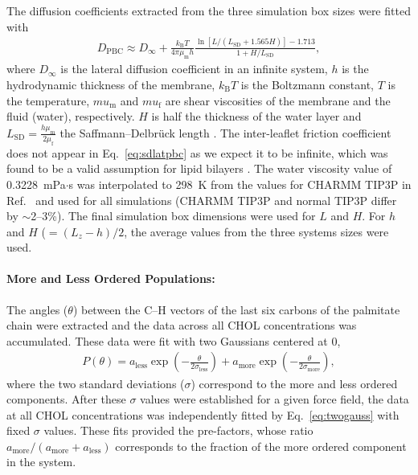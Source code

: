 \documentclass[aps,prl,superscriptaddress]{revtex4-2}
\begin{document}
The diffusion coefficients extracted from the three simulation box sizes were fitted with
%
\begin{align}
	D_\mathrm{PBC}\approx D_\infty+\frac{k_\mathrm{B}T}{4\pi\mu_\mathrm{m}h}\frac{\ln\left[L/\left(L_\mathrm{SD}+1.565H\right)\right]-1.713}{1+H/L_\mathrm{SD}},
	\label{eq:sdlatpbc}
\end{align}
%
where $D_\infty$ is the lateral diffusion coefficient in an infinite system, $h$ is the hydrodynamic thickness of the membrane, $k_\mathrm{B}T$ is the Boltzmann constant, $T$ is the temperature, $mu_\mathrm{m}$ and $mu_\mathrm{f}$ are shear viscosities of the membrane and the fluid (water), respectively. $H$ is half the thickness of the water layer and $L_\mathrm{SD}=\frac{h\mu_\mathrm{m}}{2\mu_\mathrm{f}}$ the Saffmann--Delbr\"{u}ck length \cite{vogele2018hydrodynamics}. The inter-leaflet friction coefficient does not appear in Eq.~\eqref{eq:sdlatpbc} as we expect it to be infinite, which was found to be a valid assumption for lipid bilayers \cite{vogele2018hydrodynamics}. The water viscosity value of 0.3228~mPa$\cdot$s was interpolated to 298~K from the values for CHARMM TIP3P in Ref.~ and used for all simulations (CHARMM TIP3P and normal TIP3P differ by $\sim$2--3\%). The final simulation box dimensions were used for $L$ and $H$. For $h$ and $H$ ($=(L_z-h)/2$, the average values from the three systems sizes were used. 

\paragraph{More and Less Ordered Populations:} The angles ($\theta$) between the C--H vectors of the last six carbons of the palmitate chain were extracted and the data across all CHOL concentrations was accumulated. These data were fit with two Gaussians centered at 0,
%
\begin{align}
    P(\theta)=a_\mathrm{less}\exp\left(-\frac{\theta}{2\sigma_\mathrm{less}}\right)+a_\mathrm{more}\exp\left(-\frac{\theta}{2\sigma_\mathrm{more}}\right),
    \label{eq:twogauss}
\end{align}
%
where the two standard deviations ($\sigma$) correspond to the more and less ordered components. After these $\sigma$ values were established for a given force field, the data at all CHOL concentrations was independently fitted by Eq.~\eqref{eq:twogauss} with fixed $\sigma$ values. These fits provided the pre-factors, whose ratio $a_\mathrm{more}/(a_\mathrm{more}+a_\mathrm{less})$ corresponds to the fraction of the more ordered component in the system. 
\end{document}

